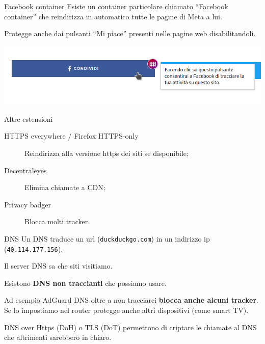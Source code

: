 \begin{myframe}{Facebook container}
  Esiste un container particolare chiamato ``Facebook container'' che reindirizza in automatico tutte le pagine di Meta a lui.

  Protegge anche dai pulsanti ``Mi piace'' presenti nelle pagine web disabilitandoli.

  \smallskip
  \includegraphics[width=.8\textwidth]{img/facebook_container}
\end{myframe}

\begin{myframe}{Altre estensioni}
  \begin{description}
    \item[HTTPS everywhere / Firefox HTTPS-only] Reindirizza alla versione https dei siti se disponibile;
    \item[Decentraleyes] Elimina chiamate a CDN;
    \item[Privacy badger] Blocca molti tracker.
  \end{description}
\end{myframe}

\begin{myframe}{DNS}
  Un DNS traduce un url (\texttt{duckduckgo.com}) in un indirizzo ip (\texttt{40.114.177.156}).

  \medskip\pause
  Il server DNS sa che siti visitiamo.

  \medskip\pause
  Esistono \textbf{DNS non traccianti} che possiamo usare.

  Ad esempio AdGuard DNS oltre a non tracciarci \textbf{blocca anche alcuni tracker}. Se lo impostiamo nel router protegge anche altri dispositivi (come smart TV).

  \medskip\pause
  DNS over Https (DoH) o TLS (DoT) permettono di criptare le chiamate al DNS che altrimenti sarebbero in chiaro.
\end{myframe}

